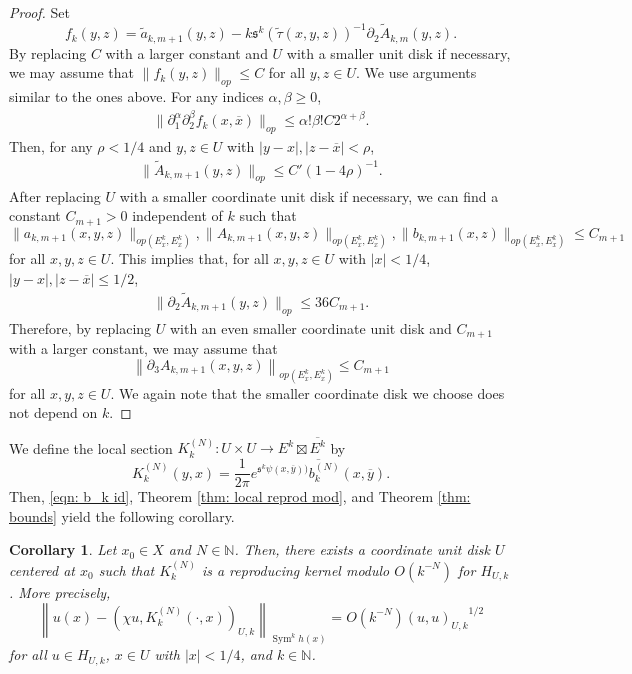\documentclass{amsart}
\newtheorem{cor}[thm]{Corollary}
\theoremstyle{definition}
\theoremstyle{remark}
\numberwithin{equation}{section}
\DeclareMathOperator{\Sym}{Sym}
\begin{document}
\begin{proof}
Set
$$
f_k(y,z) = \tilde{a}_{k,m+1}(y,z) - k \mathfrak{s}^k(\tilde{\tau}(x,y,z))^{-1} \partial_2 \tilde{A}_{k,m}(y,z).
$$
By replacing $C$ with a larger constant and $U$ with a smaller unit disk if necessary, we may assume that $\|f_k(y,z)\|_{op} \leq C$
for all $y,z \in U$. We use arguments similar to the ones above. For any indices $\alpha,\beta \geq 0$,
\begin{align*}
\|\partial_1^\alpha \partial_2^\beta f_k (x,\overline{x})\|_{op}  \leq \alpha!\beta! C 2^{\alpha+\beta}.
\end{align*}
Then, for any $\rho < 1/4$ and $y,z \in U$ with $|y-x|,|z-\overline{x}| < \rho$,
\begin{align*}
\|\tilde{A}_{k,m+1}(y,z)\|_{op}  \leq C' (1-4\rho)^{-1}.
\end{align*}
After replacing $U$ with a smaller coordinate unit disk if necessary, we can find a constant $C_{m+1} > 0$ independent of $k$ such that
$$
\|a_{k,m+1}(x,y,z)\|_{op(E^k_x, E^k_x)} ,
\|A_{k,m+1}(x,y,z)\|_{op(E^k_x, E^k_x)},
\|b_{k,m+1}(x,z)\|_{op(E^k_x, E^k_x)} \leq C_{m+1}
$$
for all $x,y,z \in U$. This implies that, for all $x, y,z \in U$ with $|x| < 1/4$, $|y-x|, |z-\overline{x}|\leq 1/2$,
\begin{align*}
\|\partial_2 \tilde{A}_{k,m+1}(y,z)\|_{op}  \leq 36 C_{m+1}.
\end{align*}
Therefore, by replacing $U$ with an even smaller coordinate unit disk and $C_{m+1}$ with a larger constant, we may assume that
$$
\left \| \partial_3 A_{k,m+1}(x,y,z) \right \|_{op(E^k_x,E^k_x)} \leq C_{m+1}
$$
for all $x,y,z \in U$. We again note that the smaller coordinate disk we choose does not depend on $k$.


\end{proof}







We define the local section $K_k^{(N)}: U \times U \to E^k \boxtimes \overline{E^k}$ by
\begin{equation*} 
K_k^{(N)}(y,x) = \frac{1}{2\pi} \overline{ e^{\mathfrak{s}^k\psi(x,\overline{y}))}b_k^{(N)}(x,\overline{y})}.
\end{equation*}
Then, \eqref{eqn: b_k id}, Theorem \ref{thm: local reprod mod}, and Theorem \ref{thm: bounds} yield the following corollary.



\begin{cor} \label{cor: local reprod mod}
Let $x_0 \in X$ and $N \in \mathbb{N}$. Then, there exists a coordinate unit disk $U$ centered at $x_0$ such that $K_k^{(N)}$ is a reproducing kernel modulo $O(k^{-N})$ for $H_{U,k}$. More precisely, 
$$
\left \|u(x) - \left (\chi u, K_k^{(N)}(\cdot,x) \right )_{U,k}  \right \|_{\Sym^kh(x)} = O ( {k^{-N}}  ) {(u,u)_{U,k}}^{1/2}
$$
for all $u \in H_{U,k}$, $x \in U$ with $|x|<1/4$, and $k \in \mathbb{N}$.
\end{cor}
\end{document}
